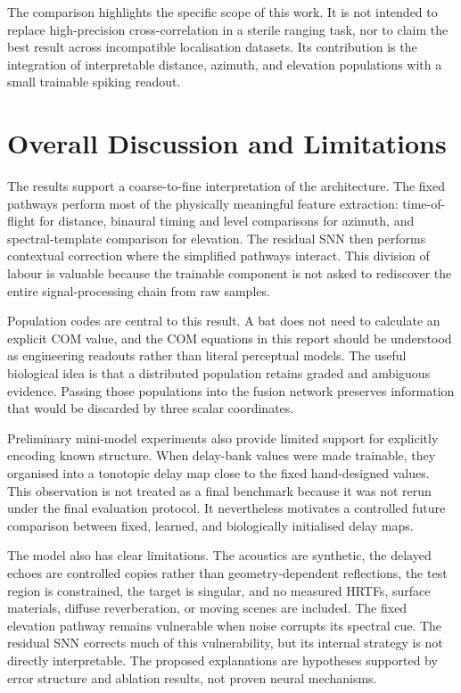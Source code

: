 The comparison highlights the specific scope of this work. It is not intended to replace high-precision cross-correlation in a sterile ranging task, nor to claim the best result across incompatible localisation datasets. Its contribution is the integration of interpretable distance, azimuth, and elevation populations with a small trainable spiking readout.

\section{Overall Discussion and Limitations}

The results support a coarse-to-fine interpretation of the architecture. The fixed pathways perform most of the physically meaningful feature extraction: time-of-flight for distance, binaural timing and level comparisons for azimuth, and spectral-template comparison for elevation. The residual SNN then performs contextual correction where the simplified pathways interact. This division of labour is valuable because the trainable component is not asked to rediscover the entire signal-processing chain from raw samples.

Population codes are central to this result. A bat does not need to calculate an explicit COM value, and the COM equations in this report should be understood as engineering readouts rather than literal perceptual models. The useful biological idea is that a distributed population retains graded and ambiguous evidence. Passing those populations into the fusion network preserves information that would be discarded by three scalar coordinates.

Preliminary mini-model experiments also provide limited support for explicitly encoding known structure. When delay-bank values were made trainable, they organised into a tonotopic delay map close to the fixed hand-designed values. This observation is not treated as a final benchmark because it was not rerun under the final evaluation protocol. It nevertheless motivates a controlled future comparison between fixed, learned, and biologically initialised delay maps.

The model also has clear limitations. The acoustics are synthetic, the delayed echoes are controlled copies rather than geometry-dependent reflections, the test region is constrained, the target is singular, and no measured HRTFs, surface materials, diffuse reverberation, or moving scenes are included. The fixed elevation pathway remains vulnerable when noise corrupts its spectral cue. The residual SNN corrects much of this vulnerability, but its internal strategy is not directly interpretable. The proposed explanations are hypotheses supported by error structure and ablation results, not proven neural mechanisms.

